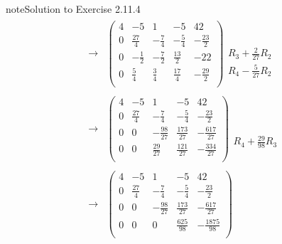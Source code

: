 \documentclass[letterpaper,10pt,english]{jupyterBook}
\begin{document}
\begin{sphinxadmonition}{note}{Solution to Exercise 2.11.4}
\begin{equation*}
\begin{split}
\begin{align*}
    \longrightarrow 
    & \left( \begin{array}{cccc|c} 
         4 & -5 & 1 & -5 & 42 \\ 
         0 & \frac{27}{4} & - \frac{7}{4} & - \frac{5}{4} & - \frac{23}{2} \\ 
         0 & - \frac{1}{2} & - \frac{7}{2} & \frac{13}{2} & -22 \\ 
         0 & \frac{5}{4} & \frac{3}{4} & \frac{17}{4} & - \frac{29}{2} \\ 
    \end{array} \right) 
    \begin{array}{l} \phantom{x} \\ \phantom{x} \\ R_{3} + \frac{2}{27} R_{2}\\ R_{4} - \frac{5}{27} R_{2} \end{array} \\ \\ 
    \longrightarrow 
    & \left( \begin{array}{cccc|c} 
         4 & -5 & 1 & -5 & 42 \\ 
         0 & \frac{27}{4} & - \frac{7}{4} & - \frac{5}{4} & - \frac{23}{2} \\ 
         0 & 0 & - \frac{98}{27} & \frac{173}{27} & - \frac{617}{27} \\ 
         0 & 0 & \frac{29}{27} & \frac{121}{27} & - \frac{334}{27} \\ 
    \end{array} \right) 
    \begin{array}{l} \phantom{x} \\ \phantom{x} \\ \phantom{x} \\ R_{4} + \frac{29}{98} R_{3}\end{array} \\ \\ 
    \longrightarrow 
    & \left( \begin{array}{cccc|c} 
         4 & -5 & 1 & -5 & 42 \\ 
         0 & \frac{27}{4} & - \frac{7}{4} & - \frac{5}{4} & - \frac{23}{2} \\ 
         0 & 0 & - \frac{98}{27} & \frac{173}{27} & - \frac{617}{27} \\ 
         0 & 0 & 0 & \frac{625}{98} & - \frac{1875}{98} \\ 
    \end{array} \right) 
\end{align*} \end{split}

\end{equation*}
\end{sphinxadmonition}
\end{document}
